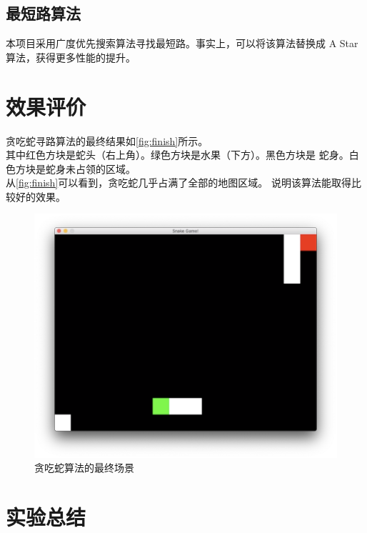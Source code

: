 \documentclass[a4paper]{article}
\begin{document}
\subsection{最短路算法}
本项目采用广度优先搜索算法寻找最短路。事实上，可以将该算法替换成
A Star算法，获得更多性能的提升。

\section{效果评价}\label{sec:eval}
贪吃蛇寻路算法的最终结果如\autoref{fig:finish}所示。\\

其中红色方块是蛇头（右上角）。绿色方块是水果（下方）。黑色方块是
蛇身。白色方块是蛇身未占领的区域。\\

从\autoref{fig:finish}可以看到，贪吃蛇几乎占满了全部的地图区域。
说明该算法能取得比较好的效果。
\begin{figure}[!hbt]
    \begin{center}
    \includegraphics[scale=0.4]{assets/finish.png}
    \caption{贪吃蛇算法的最终场景\label{fig:finish}} 
    \end{center} 
\end{figure} 

\section{实验总结}

\end{document}
